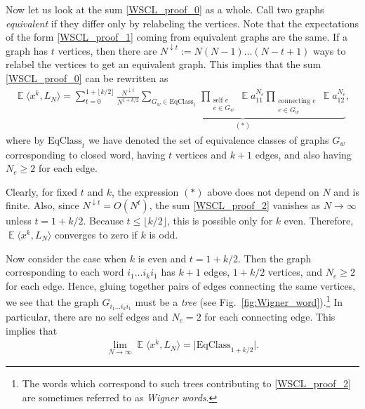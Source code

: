 \documentclass[letterpaper,11pt,oneside,reqno]{amsart}
\numberwithin{equation}{section}
\DeclareMathOperator{\EE}{\mathbb{E}}
\theoremstyle{definition}
\begin{document}
Now let us look at the sum \eqref{WSCL_proof_0} as a whole. 
Call two graphs
\emph{equivalent}
if they differ only by relabeling the vertices.
Note that the 
expectations 
of the form
\eqref{WSCL_proof_1}
coming from equivalent graphs are the same. If a graph has $t$ vertices, then there are 
$N^{\downarrow t}:=N(N-1)\ldots(N-t+1)$ ways to relabel the vertices 
to get an equivalent graph. This implies that the sum
\eqref{WSCL_proof_0} can be rewritten as
\begin{align}\label{WSCL_proof_2}
	\EE\langle x^k, L_N\rangle=\sum_{t=0}^{1+\lfloor k/2\rfloor}\frac{N^{\downarrow t}}{N^{1+k/2}}
	\underbrace{\sum_{G_w\in\text{EqClass}_t}\,
	\prod_{\substack{\text{self } e\\e\in G_{w}}}\EE a_{11}^{N_e}
	\prod_{\substack{\text{connecting } e\\ e\in G_{w}}}\EE a_{12}^{N_e}}_{(*)},
\end{align}
where by $\text{EqClass}_t$ we have denoted the set of equivalence classes
of graphs $G_w$ corresponding to closed word, having $t$ vertices and $k+1$ edges, and 
also having $N_e\ge2$ for each edge.

Clearly, for fixed $t$ and $k$, the expression $(*)$ above does not depend on $N$
and is finite. Also, since $N^{\downarrow t}=O(N^{t})$, 
the sum \eqref{WSCL_proof_2} vanishes as $N\to\infty$
unless $t=1+k/2$. Because $t\le \lfloor k/2\rfloor$, this is possible only
for $k$ even. Therefore,
$\EE\langle x^k, L_N\rangle$ converges to zero if $k$ is odd.

Now consider the case when $k$ is even and $t=1+k/2$. Then the graph corresponding to each word
$i_1 \ldots i_ki_1$ has $k+1$ edges, $1+k/2$ vertices, 
and $N_e\ge2$ for each edge. Hence, gluing together pairs of edges connecting 
the same vertices, we see that the graph 
$G_{i_1 \ldots i_ki_1}$ must be a \emph{tree} (see Fig.~\ref{fig:Wigner_word}).\footnote{The words which correspond to
such trees 
contributing to \eqref{WSCL_proof_2}
are sometimes referred to as \emph{Wigner words}.}
In particular, there are no self edges and $N_e=2$ for each connecting edge. This implies that 
\begin{align*}
	\lim_{N\to\infty}\EE\langle x^k, L_N\rangle=\big|\text{EqClass}_{1+k/2}\big|.
\end{align*}
\end{document}
